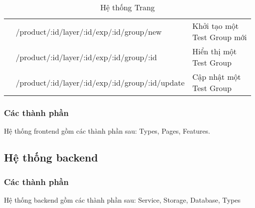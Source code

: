 \begin{table}[h!]
\begin{tabular}{|c|l|p{5cm}|}
		                            & /product/:id/layer/:id/exp/:id/group/new        & Khởi tạo một Test Group mới                    \\ \cline{2-3}
		                            & /product/:id/layer/:id/exp/:id/group/:id        & Hiển thị một Test Group                        \\ \cline{2-3}
		                            & /product/:id/layer/:id/exp/:id/group/:id/update & Cập nhật một Test Group                        \\ \hline
	\end{tabular}
	\caption{Hệ thống Trang}
\end{table}

\subsubsection{Các thành phần}

Hệ thống frontend gồm các thành phần sau: Types, Pages, Features.

\begin{itemize}
\end{itemize}

\subsection{Hệ thống backend}

\subsubsection{Các thành phần}

Hệ thống backend gồm các thành phần sau: Service, Storage, Database, Types

